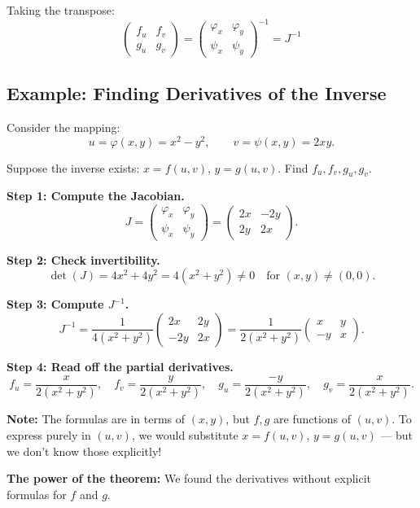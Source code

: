 \documentclass[11pt]{report}
\begin{document}
Taking the transpose:
\[
\boxed{\begin{pmatrix} f_u & f_v \\ g_u & g_v \end{pmatrix} = \begin{pmatrix} \varphi_x & \varphi_y \\ \psi_x & \psi_y \end{pmatrix}^{-1} = J^{-1}}
\]

\subsection*{Example: Finding Derivatives of the Inverse}

\begin{example}
Consider the mapping:
\[
u = \varphi(x, y) = x^2 - y^2, \qquad v = \psi(x, y) = 2xy.
\]

Suppose the inverse exists: $x = f(u, v)$, $y = g(u, v)$. Find $f_u, f_v, g_u, g_v$.

\textbf{Step 1: Compute the Jacobian.}
\[
J = \begin{pmatrix} \varphi_x & \varphi_y \\ \psi_x & \psi_y \end{pmatrix} = \begin{pmatrix} 2x & -2y \\ 2y & 2x \end{pmatrix}.
\]

\textbf{Step 2: Check invertibility.}
\[
\det(J) = 4x^2 + 4y^2 = 4(x^2 + y^2) \neq 0 \quad \text{for } (x, y) \neq (0, 0).
\]

\textbf{Step 3: Compute $J^{-1}$.}
\[
J^{-1} = \frac{1}{4(x^2 + y^2)} \begin{pmatrix} 2x & 2y \\ -2y & 2x \end{pmatrix} = \frac{1}{2(x^2 + y^2)} \begin{pmatrix} x & y \\ -y & x \end{pmatrix}.
\]

\textbf{Step 4: Read off the partial derivatives.}
\[
f_u = \frac{x}{2(x^2 + y^2)}, \quad f_v = \frac{y}{2(x^2 + y^2)}, \quad g_u = \frac{-y}{2(x^2 + y^2)}, \quad g_v = \frac{x}{2(x^2 + y^2)}.
\]

\textbf{Note:} The formulas are in terms of $(x, y)$, but $f, g$ are functions of $(u, v)$. To express purely in $(u, v)$, we would substitute $x = f(u, v)$, $y = g(u, v)$ --- but we don't know those explicitly!

\textbf{The power of the theorem:} We found the derivatives without explicit formulas for $f$ and $g$.
\end{example}
\end{document}
